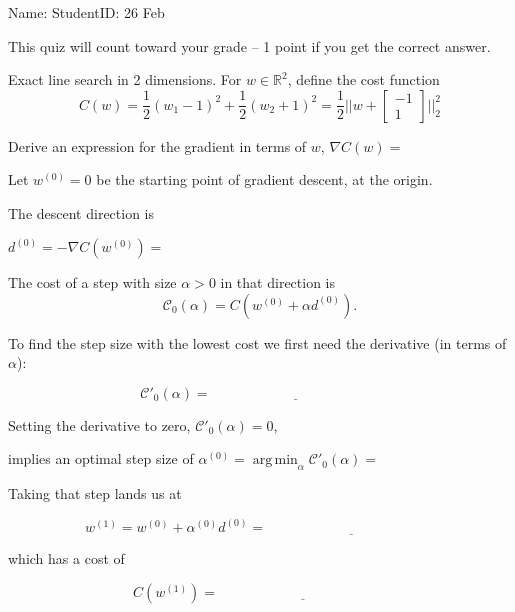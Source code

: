 \documentclass[12pt]{article}
\DeclareMathOperator*{\argmin}{arg\,min}
\begin{document}
\thispagestyle{empty}

Name: \underline{\hspace{2in}} StudentID: \underline{\hspace{2in}} 26 Feb

This quiz will count toward your grade -- 1 point if you get the
correct answer.

Exact line search in 2 dimensions. For $w\in\mathbb R^2$, define the
cost function
$$C(w) = \frac 1 2 (w_1-1)^2 + \frac 1 2 (w_2+1)^2 = \frac 1 2 ||w +
\left[\begin{array}{c}
  -1\\
   1
\end{array}\right]
||^2_2$$

\vskip 1cm
Derive an expression for the gradient in terms of $w$, $\nabla C(w)=$\underline{\hspace{2in}}

Let $w^{(0)}=0$ be the starting point of gradient descent, at the
origin. 

\vskip 1cm
The descent direction is

$d^{(0)} = -\nabla C(w^{(0)})=$\underline{\hspace{2in}}

The cost of a step with size $\alpha>0$ in that direction is
\begin{equation*}
  \mathcal C_0(\alpha) = C(w^{(0)} + \alpha d^{(0)}).
\end{equation*}

To find the step size with the lowest cost we first need the derivative
(in terms of $\alpha$):

\vskip 1cm
\begin{equation*}
  \mathcal C'_0(\alpha) = \underline{\hspace{2in}}
\end{equation*}

\vskip 1cm
Setting the derivative to zero, $\mathcal C'_0(\alpha)=0$, 

implies an optimal step size of
$\alpha^{(0)}=\argmin_\alpha \mathcal
C'_0(\alpha)=$\underline{\hspace{2in}}

\vskip 1cm
Taking that step lands us at 

\begin{equation*}
  w^{(1)} = w^{(0)} + \alpha^{(0)} d^{(0)} = \underline{\hspace{2in}}
\end{equation*}

\vskip 1cm
which has a cost of

\begin{equation*}
  C(w^{(1)}) = \underline{\hspace{2in}}
\end{equation*}
\end{document}
